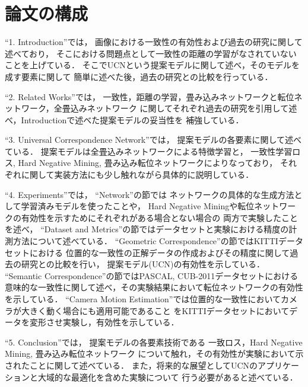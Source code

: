 \section{論文の構成}

``1. Introduction''では，
画像における一致性の有効性および過去の研究に関して述べており，
そこにおける問題点として一致性の距離の学習がなされていないことを上げている．
そこでUCNという提案モデルに関して述べ，そのモデルを成す要素に関して
簡単に述べた後，過去の研究との比較を行っている．

``2. Related Works''では，
一致性，距離の学習，畳み込みネットワークと転位ネットワーク，全畳込みネットワーク
に関してそれぞれ過去の研究を引用して述べ，Introductionで述べた提案モデルの妥当性を
補強している．

``3. Universal Correspondence Network''では，
提案モデルの各要素に関して述べている．
提案モデルは全畳込みネットワークによる特徴学習と，
一致性学習ロス, Hard Negative Mining, 畳み込み転位ネットワークによりなっており，
それぞれに関して実装方法にも少し触れながら具体的に説明している．

``4. Experiments''では，
``Network''の節では
ネットワークの具体的な生成方法として学習済みモデルを使ったことや，
Hard Negative Miningや転位ネットワークの有効性を示すためにそれぞれがある場合とない場合の
両方で実験したことを述べ，
``Dataset and Metrics''の節ではデータセットと実験における精度の計測方法について述べている．
``Geometric Correspondence''の節ではKITTIデータセットにおける
位置的な一致性の正解データの作成およびその精度に関して過去の研究との比較を行い，
提案モデル(UCN)の有効性を示している．
``Semantic Correspondence''の節ではPASCAL, CUB-2011データセットにおける
意味的な一致性に関して述べ，その実験結果において転位ネットワークの有効性を示している．
``Camera Motion Estimation''では位置的な一致性においてカメラが大きく動く場合にも適用可能であること
をKITTIデータセットにおいてデータを変形させ実験し，有効性を示している．

``5. Conclusion''では，
提案モデルの各要素技術である
一致ロス，Hard Negative Mining, 畳み込み転位ネットワーク
について触れ，その有効性が実験において示されたことに関して述べている．
また，将来的な展望としてUCNのアプリケーションと大域的な最適化を含めた実験について
行う必要があると述べている．
